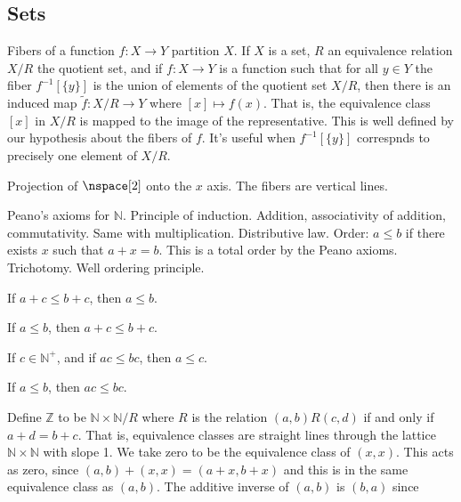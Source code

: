     \subsection{Sets}
        Fibers of a function $f:X\rightarrow{Y}$ partition $X$.
        If $X$ is a set, $R$ an equivalence relation $X/R$ the quotient set,
        and if $f:X\rightarrow{Y}$ is a function such that for all $y\in{Y}$
        the fiber $f^{\minus{1}}[\{y\}]$ is the union of elements of the
        quotient set $X/R$, then there is an induced map
        $\tilde{f}:X/R\rightarrow{Y}$ where $[x]\mapsto{f}(x)$. That is,
        the equivalence class $[x]$ in $X/R$ is mapped to the image of
        the representative. This is well defined by our hypothesis about the
        fibers of $f$. It's useful when $f^{\minus{1}}[\{y\}]$ correspnds to
        precisely one element of $X/R$.
        \begin{example}
            Projection of $\nspace[2]$ onto the $x$ axis. The fibers are
            vertical lines.
        \end{example}
        Peano's axioms for $\mathbb{N}$. Principle of induction. Addition,
        associativity of addition, commutativity. Same with multiplication.
        Distributive law. Order: $a\leq{b}$ if there exists $x$ such that
        $a+x=b$. This is a total order by the Peano axioms. Trichotomy.
        Well ordering principle.
        \begin{theorem}
            If $a+c\leq{b}+c$, then $a\leq{b}$.
        \end{theorem}
        \begin{theorem}
            If $a\leq{b}$, then $a+c\leq{b}+c$.
        \end{theorem}
        \begin{theorem}
            If $c\in\mathbb{N}^{+}$, and if $ac\leq{b}c$, then $a\leq{c}$.
        \end{theorem}
        \begin{theorem}
            If $a\leq{b}$, then $ac\leq{b}c$.
        \end{theorem}
        Define $\mathbb{Z}$ to be $\mathbb{N}\times\mathbb{N}/R$ where $R$
        is the relation $(a,b)R(c,d)$ if and only if $a+d=b+c$. That is,
        equivalence classes are straight lines through the lattice
        $\mathbb{N}\times\mathbb{N}$ with slope 1. We take zero to be the
        equivalence class of $(x,x)$. This acts as zero, since
        $(a,b)+(x,x)=(a+x,b+x)$ and this is in the same equivalence class as
        $(a,b)$. The additive inverse of $(a,b)$ is $(b,a)$ since
